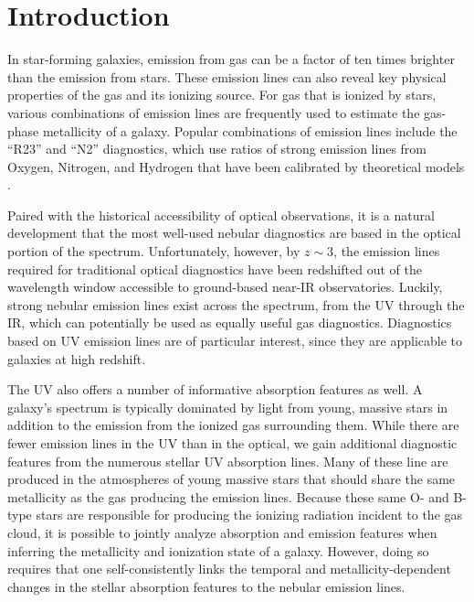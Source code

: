 \documentclass[preprint2]{aastex61}
\newcommand{\z}[1]{$z \sim {#1}$}
\begin{document}
\section{Introduction} \label{sec:intro}

In star-forming galaxies, emission from gas can be a factor of ten times brighter than the emission from stars. These emission lines can also reveal key physical properties of the gas and its ionizing source. For gas that is ionized by stars, various combinations of emission lines are frequently used to estimate the gas-phase metallicity of a galaxy. Popular combinations of emission lines include the ``R23'' \citep{Pagel+1979} and ``N2''\citep{Pettini+2004} diagnostics, which use ratios of strong emission lines from Oxygen, Nitrogen, and Hydrogen that have been calibrated by theoretical models \citep[e.g.,][]{McGaugh+1991, Kewley+2002}.

Paired with the historical accessibility of optical observations, it is a natural development that the most well-used nebular diagnostics are based in the optical portion of the spectrum. Unfortunately, however, by \z{3}, the emission lines required for traditional optical diagnostics have been redshifted out of the wavelength window accessible to ground-based near-IR observatories. Luckily, strong nebular emission lines exist across the spectrum, from the UV through the IR, which can potentially be used as equally useful gas diagnostics. Diagnostics based on UV emission lines are of particular interest, since they are applicable to galaxies at high redshift.

The UV also offers a number of informative absorption features as well. A galaxy's spectrum is typically dominated by light from young, massive stars in addition to the emission from the ionized gas surrounding them. While there are fewer emission lines in the UV than in the optical, we gain additional diagnostic features from the numerous stellar UV absorption lines. Many of these line are produced in the atmospheres of young massive stars that should share the same metallicity as the gas producing the emission lines. Because these same O- and B-type stars are responsible for producing the ionizing radiation incident to the gas cloud, it is possible to jointly analyze absorption and emission features when inferring the metallicity and ionization state of a galaxy. However, doing so requires that one self-consistently links the temporal and metallicity-dependent changes in the stellar absorption features to the nebular emission lines.
\end{document}
